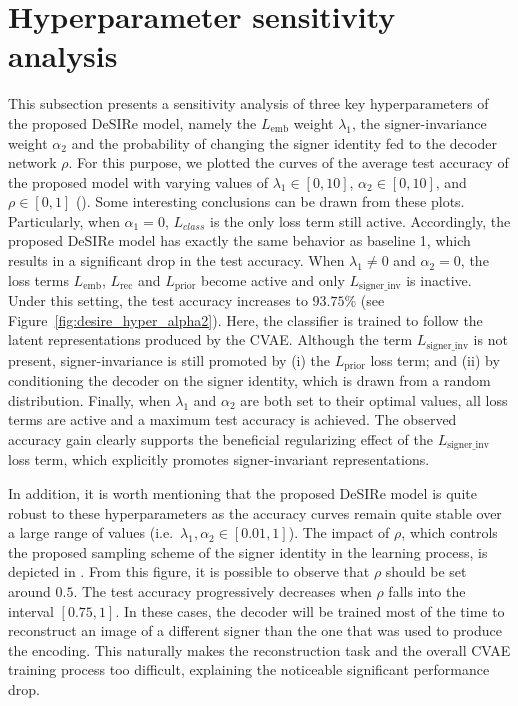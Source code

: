 \section{Hyperparameter sensitivity analysis}
\label{sec:desire_hyperparams}
This subsection presents a sensitivity analysis of three key hyperparameters of the proposed DeSIRe model, namely the $L_{\text{emb}}$ weight $\lambda_{1}$, the signer-invariance weight $\alpha_{2}$ and the probability of changing the signer identity fed to the decoder network $\rho$. For this purpose, we plotted the curves of the average test accuracy of the proposed model with varying values of $\lambda_{1}\in[0,10]$,  $\alpha_{2}\in[0,10]$, and $\rho\in[0,1]$ (). Some interesting conclusions can be drawn from these plots. Particularly, when $\alpha_{1}=0$, $L_{class}$ is the only loss term still active. Accordingly, the proposed DeSIRe model has exactly the same behavior as baseline 1, which results in a significant drop in the test accuracy. When $\lambda_{1}\neq 0$ and $\alpha_{2}=0$, the loss terms $L_{\text{emb}}$, $L_{\text{rec}}$ and $L_{\text{prior}}$ become active and only $L_{\text{signer\_inv}}$ is inactive. Under this setting, the test accuracy increases to $93.75\%$ (see Figure~\ref{fig:desire_hyper_alpha2}). Here, the classifier is trained to follow the latent representations produced by the CVAE. Although the term $L_{\text{signer\_inv}}$ is not present, signer-invariance is still promoted by (i) the $L_{\text{prior}}$ loss term; and (ii) by conditioning the decoder on the signer identity, which is drawn from a random distribution. Finally, when $\lambda_1$ and $\alpha_2$ are both set to their optimal values, all loss terms are active and a maximum test accuracy is achieved. The observed accuracy gain clearly supports the beneficial regularizing effect of the $L_{\text{signer\_inv}}$ loss term, which explicitly promotes signer-invariant representations.

In addition, it is worth mentioning that the proposed DeSIRe model is quite robust to these hyperparameters as the accuracy curves remain quite stable over a large range of values (i.e.\ $\lambda_{1},\alpha_{2}\in [0.01, 1]$). The impact of $\rho$, which controls the proposed sampling scheme of the signer identity in the learning process, is depicted in . From this figure, it is possible to observe that $\rho$ should be set around $0.5$. The test accuracy progressively decreases when $\rho$ falls into the interval $[0.75, 1]$. In these cases, the decoder will be trained most of the time to reconstruct an image of a different signer than the one that was used to produce the encoding. This naturally makes the reconstruction task and the overall CVAE training process too difficult, explaining the noticeable significant performance drop.

